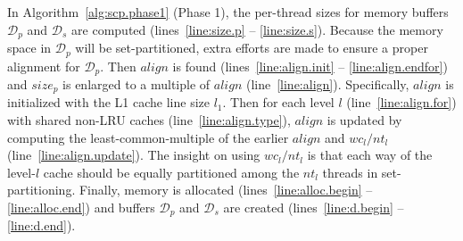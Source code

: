 In Algorithm~\ref{alg:scp.phase1} (Phase 1),
the per-thread sizes for memory buffers $\mathcal{D}_p$ and
$\mathcal{D}_s$ are computed
(lines~\ref{line:size.p} -- \ref{line:size.s}).
Because the memory space in $\mathcal{D}_p$ will be set-partitioned,
extra efforts are made to ensure a proper alignment for $\mathcal{D}_p$.
Then $align$ is found
(lines~\ref{line:align.init} -- \ref{line:align.endfor}) 
and $size_p$ is enlarged to a multiple of $align$ (line~\ref{line:align}).
Specifically, $align$ is initialized with the L1 cache line size $l_1$.
Then for each level $l$ (line~\ref{line:align.for})
with shared non-LRU caches (line~\ref{line:align.type}),
$align$ is updated by computing the least-common-multiple of
the earlier $align$ and $wc_l/nt_l$ (line~\ref{line:align.update}).
The insight on using $wc_l/nt_l$ is that
each way of the level-$l$ cache should be
equally partitioned among the $nt_l$ threads
in set-partitioning.
Finally, memory is allocated (lines~\ref{line:alloc.begin} -- \ref{line:alloc.end})
and buffers $\mathcal{D}_p$ and $\mathcal{D}_s$
are created (lines~\ref{line:d.begin} -- \ref{line:d.end}).

